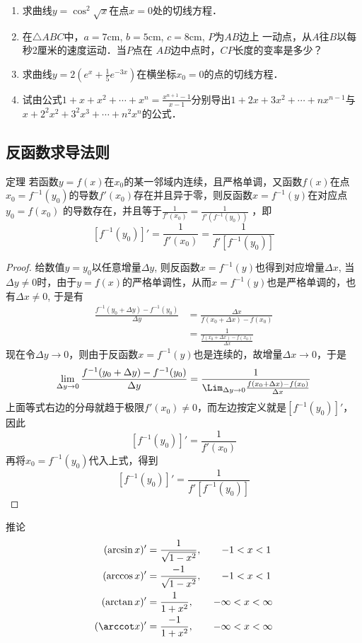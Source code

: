 \begin{ex}
\begin{enumerate}
\item 求曲线$y=\cos^2\sqrt{x}$在点$x=0$处的切线方程．
\item 在$\triangle ABC$中，$a=7$cm, $b=5$cm, $c=8$cm, $P$为$AB$边上
一动点，从$A$往$B$以每秒2厘米的速度运动．当$P$点在
$AB$边中点时，$CP$长度的变率是多少？
\item 求曲线$y=2\left(e^x+\frac{1}{5}e^{-3x}\right)$在横坐标$x_0=0$的点的切线方程．
\item 试由公式$1+x+x^2+\cdots+x^n=\frac{x^{n+1}-1}{x-1}$分别导出$1+2x+3x^2+\cdots+nx^{n-1}$与$x+2^2x^2+3^2x^3+\cdots +n^2x^n$的公式．
\end{enumerate}  
\end{ex}


\subsection{反函数求导法则}

\begin{blk}
    {定理} 若函数$y=f(x)$在$x_0$的某一邻域内连续，且严格单调，又函数$f(x)$在点$x_0=f^{-1}(y_0)$的导数$f'(x_0)$存在并且异于零，则反函数$x=f^{-1}(y)$在对应点$y_0=f(x_0)$
的导数存在，并且等于$\frac{1}{f'(x_0)}=\frac{1}{f'(f^{-1}(y_0))}$
，即
\[[f^{-1}(y_0)]'=\frac{1}{f'(x_0)}=\frac{1}{f'[f^{-1}(y_0)]}\]
\end{blk}

\begin{proof}
给数值$y=y_0$以任意增量$\Delta y$, 则反函数$x=f^{-1}(y)$也得到对应增量$\Delta x$, 当$\Delta y\ne 0$时，由于$y=f(x)$的严格单调性，从而$x=f^{-1}(y)$也是严格单调的，也有$\Delta x\ne 0$, 于是有
\begin{align*}
    \frac{f^{-1}(y_0+\Delta y)-f^{-1}(y_0)}{\Delta y}&=\frac{\Delta x}{f(x_0+\Delta x)-f(x_0)}\\
    &=\frac{1}{\frac{f(x_0+\Delta x)-f(x_0)}{\Delta x}}
\end{align*}
现在令$\Delta y\to 0$，则由于反函数$x=f^{-1}(y)$也是连续的，故增量$\Delta x\to 0$，于是
\[\lim_{\Delta y\to 0}\frac{f^{-1}(y_0+\Delta y)-f^{-1}(y_0)}{\Delta y}=\frac{1}{\Lim_{\Delta y\to 0}\frac{f(x_0+\Delta x)-f(x_0)}{\Delta x}}\]
上面等式右边的分母就趋于极限$f'(x_0)\ne 0$，而左边按定义就是$[f^{-1}(y_0)]'$，因此
\[[f^{-1}(y_0)]'=\frac{1}{f'(x_0)}\]
再将$x_0=f^{-1}(y_0)$代入上式，得到
\[[f^{-1}(y_0)]'=\frac{1}{f'[f^{-1}(y_0)]}\]
\end{proof}

\begin{blk}{推论}
\begin{align*}
    (\arcsin x)'&=\frac{1}{\sqrt{1-x^2}},\qquad -1<x<1\\
    (\arccos x)'&=\frac{-1}{\sqrt{1-x^2}},\qquad -1<x<1\\
    (\arctan x)'&=\frac{1}{{1+x^2}},\qquad -\infty<x<\infty\\
    (\arccot x)'&=\frac{-1}{{1+x^2}},\qquad -\infty<x<\infty\\
\end{align*}
\end{blk}

